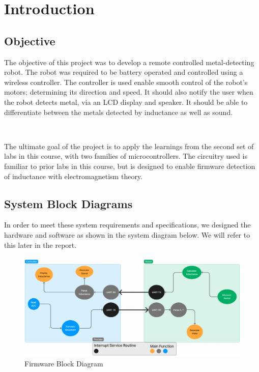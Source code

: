 \documentclass{article}
\begin{document}
\newpage

\tableofcontents

\newpage
\section{Introduction}

\subsection{Objective}

The objective of this project was to develop a remote controlled metal-detecting robot. The robot was required to be
battery operated and controlled using a wireless controller. The controller is used enable smooth control of the robot's
motors; determining its direction and speed. It should also notify the user when the robot detects metal, via an LCD
display and speaker. It should be able to differentiate between the metals detected by inductance as well as sound.

\

The ultimate goal of the project is to apply the learnings from the second set of labs in this course, with two families of microcontrollers.
The circuitry used is familiar to prior labs in this course, but is designed to enable firmware detection of inductance with electromagnetism theory.

\subsection{System Block Diagrams}

In order to meet these system requirements and specifications, we designed the hardware and software as shown in the system diagram below. We will refer to this later in the report.

\begin{figure}[h]
        \centering
        \includegraphics[width=1\linewidth]{Figures/Firmware_Block_Diagram.png}
        \caption{Firmware Block Diagram}
        \label{fig:firmware_block_diagram}
\end{figure}
\end{document}

